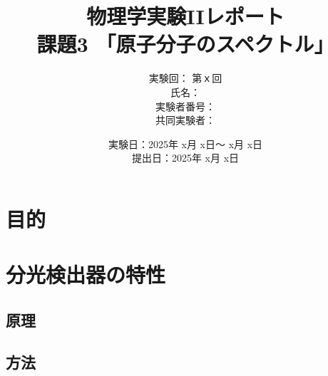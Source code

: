 \documentclass[uplatex,dvipdfmx,a4j,12pt]{jsarticle}
\title{
  物理学実験IIレポート\\    %
  課題3 「原子分子のスペクトル」
  }
\author{
  実験回： 第ｘ回 \\
  氏名： \\
  実験者番号：
  \\
  共同実験者：
  }
\date{
  実験日：2025年 x月 x日～ x月 x日 \\
  提出日：2025年 x月 x日}  %
\begin{document}
\maketitle

\vspace{2em}

\begin{center}
    \begin{minipage}{0.5\linewidth}
    \end{minipage}
\end{center}

\vspace{5em}  

\begin{abstract}
\end{abstract}

\newpage

\section{目的}

\newpage


\section{分光検出器の特性}
\subsection{原理}

\subsection{方法}
\end{document}
